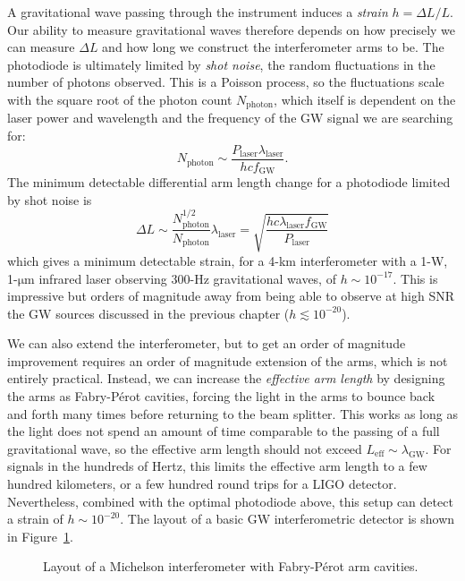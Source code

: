 A gravitational wave passing through the instrument induces a \textit{strain} $h = \Delta L / L$.
Our ability to measure gravitational waves therefore depends on how precisely we can measure $\Delta L$ and how long we construct the interferometer arms to be.
The photodiode is ultimately limited by \textit{shot noise}, the random fluctuations in the number of photons observed.
This is a Poisson process, so the fluctuations scale with the square root of the photon count $N_{\mathrm{photon}}$, which itself is dependent on the laser power and wavelength and the frequency of the GW signal we are searching for:
\begin{equation}
  N_{\mathrm{photon}} \sim \frac{P_{\mathrm{laser}} \lambda_{\mathrm{laser}}}{h c f_{\mathrm{GW}}}.
\end{equation}
The minimum detectable differential arm length change for a photodiode limited by shot noise is
\begin{equation}
  \Delta L \sim \frac{N_{\mathrm{photon}}^{1/2}}{N_{\mathrm{photon}}} \lambda_{\mathrm{laser}} = \sqrt{ \frac{h c \lambda_{\mathrm{laser}} f_{\mathrm{GW}}}{P_{\mathrm{laser}}} }
\end{equation}
which gives a minimum detectable strain, for a 4-km interferometer with a 1-W, 1-$\mathrm{\mu}$m infrared laser observing 300-Hz gravitational waves, of $h \sim 10^{-17}$.
This is impressive but orders of magnitude away from being able to observe at high \ac{SNR} the GW sources discussed in the previous chapter ($h \lesssim 10^{-20}$).

We can also extend the interferometer, but to get an order of magnitude improvement requires an order of magnitude extension of the arms, which is not entirely practical.
Instead, we can increase the \textit{effective arm length} by designing the arms as Fabry-P\'erot cavities, forcing the light in the arms to bounce back and forth many times before returning to the beam splitter.
This works as long as the light does not spend an amount of time comparable to the passing of a full gravitational wave, so the effective arm length should not exceed $L_{\mathrm{eff}} \sim \lambda_{\mathrm{GW}}$.
For signals in the hundreds of Hertz, this limits the effective arm length to a few hundred kilometers, or a few hundred round trips for a LIGO detector.
Nevertheless, combined with the optimal photodiode above, this setup can detect a strain of $h \sim 10^{-20}$.
The layout of a basic GW interferometric detector is shown in Figure~\ref{fig:detectors-basic}.

\begin{figure}
  \caption{Layout of a Michelson interferometer with Fabry-P\'erot arm cavities.}
  \label{fig:detectors-basic}
\end{figure}


